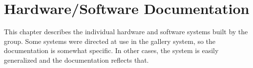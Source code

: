 \chapter{Hardware/Software Documentation}
This chapter describes the individual hardware and software systems built by the group. Some systems were directed at use in the gallery system, so the documentation is somewhat specific. In other cases, the system is easily generalized and the documentation reflects that.





